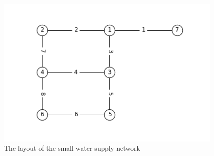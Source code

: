     \begin{figure}[H]
        \centering
        \includegraphics[scale=0.50]{Figures/Images/Reliability Analysis of Water Supply Network/small_WSN.png}
        \caption{The layout of the small water supply network}
        \label{fig:Small_WSN}
    \end{figure}